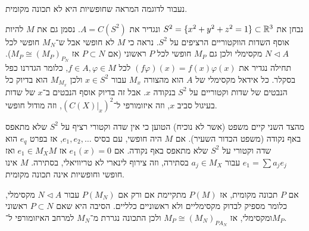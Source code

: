 נעבור לדוגמה המראה שחופשיות היא לא תכונה מקומית.
\begin{example}
	נבחן את $S^2 = \{ x^2 + y^2 + z^2 = 1 \} \subset \mathbb{R}^3$ ונגדיר את $A = C(S^2)$.
	נסמן גם את $M$ להיות אוסף השדות הווקטוריים הרציפים על $S^2$.
	נראה כי $M$ לא חופשי אבל ש־$M_N$ חופשי לכל $N \triangleleft A$ מקסימלי ולכן גם $M_P$ חופשי לכל $P$ ראשוני (אם $P \subset N$ אז $M_P \cong {(M_P)}_{P_N}$).
	תחילה נגדיר את $(f \varphi)(x) = f(x) \varphi(x)$ לכל $f \in A, \varphi \in M$, כלומר הגדרנו כפל בסקלר.
	כל אידאל מקסימלי של $A$ הוא מהצורה $M_x$ עבור $x \in S^2$ ולכן $M_{M_x}$ הוא בדיוק כל הנבטים של שדות וקטוריים על $S^2$ בנקודה $x$.
	אבל זה בדיוק אוסף הנבטים ב־$x$ של שדות בעיגול סביב $x$, וזה איזומורפי ל־${(C(X) |_x)}^2$, וזה מודול חופשי.

	מהצד השני קיים משפט (אשר לא נוכיח) הטוען כי אין שדה וקטורי רציף על $S^2$ שלא מתאפס באף נקודה (משפט הכדור השעיר).
	אם $M$ היה חופשי, עם בסיס $e_1, e_2, \ldots$, אז בפרט $e_q$ הוא שדה וקטורי על $S^2$ שלא מתאפס באף נקודה.
	אם $e_1(x) = 0$ אז $e_1 \in M_X M$ ואז $e_1 = \sum a_j e_j$ עבור $a_j \in M_X$ בסתירה, וזה צירוף לינארי לא טריוויאלי, בסתירה.
	$M$ אינו חופשי וחופשיות אינה תכונה מקומית.
\end{example}
\begin{remark}
	אם $P$ תכונה מקומית, אז $P(M)$ מתקיימת אם ורק אם $P(M_N)$ עבור $N \triangleleft A$ מקסימלי, כלומר מספיק לבדוק מקסימליים ולא ראשוניים כלליים.
	הסיבה היא שאם $P \subset N$ ראשוני ומקסימלי, אז $M_P \cong {(M_N)}_{P A_N}$ ולכן התכונה נגררת מ־$M_N$ למרחב האיזומורפי ל־$M_P$.
\end{remark}

\listoftheorems[title=הגדרות ומשפטים,ignoreall,show={theorem,definition},swapnumber,onlynamed={proposition}]

